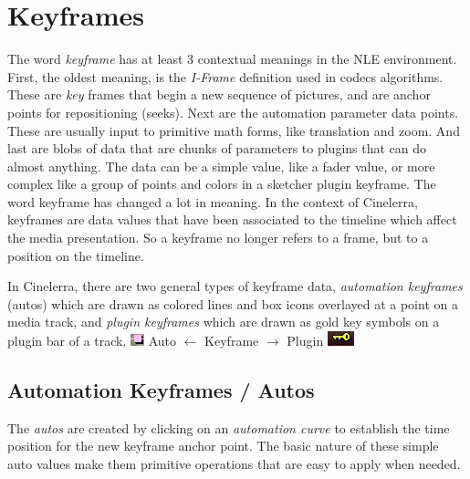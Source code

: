 \chapter{Keyframes}%
\label{cha:keyframes}

The word \textit{keyframe} has at least 3 contextual meanings in the NLE environment.  First, the oldest meaning, is the \textit{I-Frame} definition used in codecs algorithms.  These are \textit{key} frames that begin a new sequence of pictures, and are anchor points for repositioning (seeks).  Next are the automation parameter data points.  These are usually input to primitive math forms, like translation and zoom.  And last are blobs of data that are chunks of parameters to plugins that can do almost anything.  The data can be a simple value, like a fader value, or more complex like a group of points and colors in a sketcher plugin keyframe.  The word keyframe has changed a lot in meaning.  In the context of Cinelerra, keyframes are data values that have been associated to the timeline which affect the media presentation.  So a keyframe no longer refers to a frame, but to a position on the timeline.

In Cinelerra, there are two general types of keyframe data, \textit{automation keyfra\-mes} (autos) which are drawn as colored lines and box icons overlayed at a point on a media track, and \textit{plugin keyframes} which are drawn as gold key symbols on a plugin bar of a track.  \quad
\includegraphics[height=\baselineskip]{images/auto.png}	         
Auto $\leftarrow$ Keyframe $\rightarrow$ 
Plugin \includegraphics[height=\baselineskip]{images/plugin.png}

\section{Automation Keyframes / Autos}%
\label{sec:automation_keyframes_autos}

The \textit{autos} are created by clicking on an \textit{automation curve} to establish the time position for the new keyframe anchor point.  The basic nature of these simple auto values make them primitive operations that are easy to apply when needed.  

